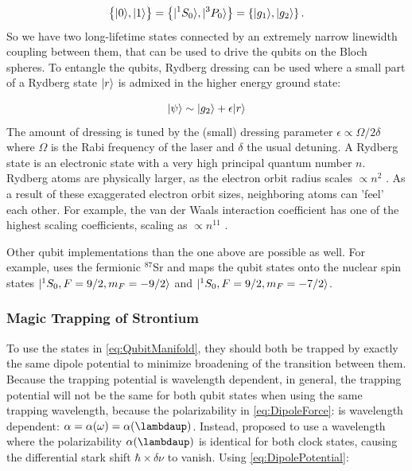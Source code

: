 \begin{equation}\label{eq:QubitManifold}
	\big\{\lvert0\rangle,\lvert1\rangle\big\} = 
	\left\{
		\lvert{}^1S_0\rangle, \lvert{}^3P_0\rangle 
	\right\} = 
	\left\{ 
	    \lvert g_1\rangle, \lvert g_2\rangle
	\right\}.
\end{equation}
So we have two long-lifetime states connected by an extremely narrow linewidth coupling between them, that can be used to drive the qubits on the Bloch spheres.
To entangle the qubits, Rydberg dressing can be used \cite{Wu2021} where a small part of a Rydberg state $\lvert r\rangle$ is admixed in the higher energy ground state:

\begin{equation}\label{eq:RydbergDressing}
	\lvert\psi\rangle \sim \lvert g_2\rangle + \epsilon \lvert r\rangle
\end{equation}
The amount of dressing is tuned by the (small) dressing parameter $\epsilon \propto \Omega / 2\delta$ where $\Omega$ is the Rabi frequency of the laser and $\delta$ the usual detuning. 
A Rydberg state is an electronic state with a very high principal quantum number $n$. Rydberg atoms are physically larger, as the electron orbit radius scales $\propto n^2$ \cite{Gallagher1994}. 
As a result of these exaggerated electron orbit sizes, neighboring atoms can 'feel' each other.
For example, the van der Waals interaction coefficient has one of the highest scaling coefficients, scaling as $\propto n^{11}$ \cite{Gallagher1994}. 

Other qubit implementations than the one above are possible as well.
For example, \cite{Barnes2021} uses the fermionic ${}^{87}$Sr and maps the qubit states onto the nuclear spin states $\lvert{}^1S_0, F=9/2, m_F = -9/2\rangle$ and $\lvert{}^1S_0, F=9/2, m_F = -7/2\rangle$.

\subsubsection*{Magic Trapping of Strontium}\label{sec:Magic}

To use the states in \cref{eq:QubitManifold}, they should both be trapped by exactly the same dipole potential to minimize broadening of the transition between them.
Because the trapping potential is wavelength dependent, in general, the trapping potential will not be the same for both qubit states when using the same trapping wavelength, because the polarizability in \cref{eq:DipoleForce}: is wavelength dependent: $\alpha = \alpha(\omega) = \alpha(\lambdaup)$.
Instead, \cite{Katori2003} proposed to use a wavelength where the polarizability $\alpha(\lambdaup)$ is identical for both clock states, causing the differential stark shift $\hbar \times \delta \nu$ to vanish.
Using \cref{eq:DipolePotential}:

